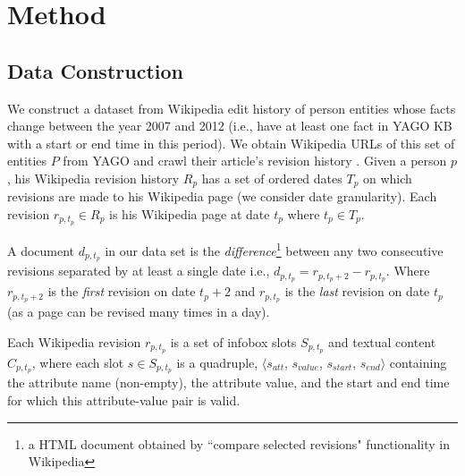\section{Method} \label{sec:method}

\subsection{Data Construction} \label{sec:data}
We construct a dataset from Wikipedia edit history of person entities whose facts change between the year 2007 and 2012 (i.e., have at least one fact in YAGO KB \cite{suchanek2007yago} with a start or end time in this period). We obtain Wikipedia URLs of this set of entities $P$ from YAGO and crawl their article's revision history%
. Given a person $p$, his Wikipedia revision history $R_p$ has a set of ordered dates $T_p$ on which revisions are made to his Wikipedia page (we consider date granularity). Each revision $r_{p, t_p} \in R_p$ is his Wikipedia page at date $t_p$ where $t_p \in T_p$. 

A document $d_{p, t_p}$ in our data set is the \textit{difference}\footnote{a HTML document obtained by ``compare selected revisions"  functionality in Wikipedia} between any two consecutive revisions separated by at least a single date i.e., $d_{p, t_p} = r_{p, t_p+2} - r_{p, t_p}$. Where $r_{p, t_p+2}$ is the \textit{first} revision on date $t_p+2$ and $r_{p, {t_p}}$ is the \textit{last} revision on date $t_p$ (as a page can be revised many times in a day). 


Each Wikipedia revision $r_{p, t_p}$ is a set of infobox slots $S_{p, t_p}$ and textual content $C_{p, t_p}$, where each slot $s \in S_{p, t_p}$ is a quadruple, $\langle s_{att}$, $s_{value}$,  $s_{start}$, $s_{end} \rangle$ containing the attribute name (non-empty), the attribute value, and the start and end time for which this attribute-value pair is valid. 

